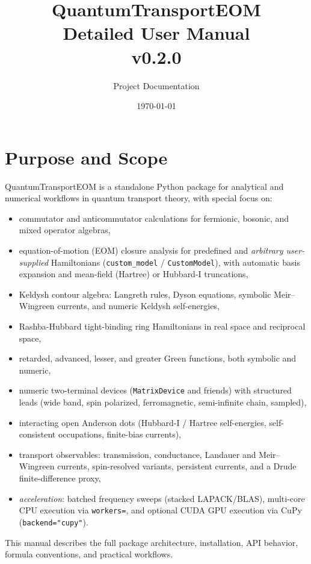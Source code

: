 \documentclass[11pt,a4paper]{article}
\title{QuantumTransportEOM\\Detailed User Manual\\\large v0.2.0}
\author{Project Documentation}
\date{\today}
\begin{document}
\maketitle
\tableofcontents
\newpage

\section{Purpose and Scope}
QuantumTransportEOM is a standalone Python package for analytical and numerical workflows in quantum transport theory, with special focus on:
\begin{itemize}[leftmargin=1.5em]
  \item commutator and anticommutator calculations for fermionic, bosonic, and mixed operator algebras,
  \item equation-of-motion (EOM) closure analysis for predefined and \emph{arbitrary user-supplied} Hamiltonians (\texttt{custom\_model} / \texttt{CustomModel}), with automatic basis expansion and mean-field (Hartree) or Hubbard-I truncations,
  \item Keldysh contour algebra: Langreth rules, Dyson equations, symbolic Meir--Wingreen currents, and numeric Keldysh self-energies,
  \item Rashba-Hubbard tight-binding ring Hamiltonians in real space and reciprocal space,
  \item retarded, advanced, lesser, and greater Green functions, both symbolic and numeric,
  \item numeric two-terminal devices (\texttt{MatrixDevice} and friends) with structured leads (wide band, spin polarized, ferromagnetic, semi-infinite chain, sampled),
  \item interacting open Anderson dots (Hubbard-I / Hartree self-energies, self-consistent occupations, finite-bias currents),
  \item transport observables: transmission, conductance, Landauer and Meir--Wingreen currents, spin-resolved variants, persistent currents, and a Drude finite-difference proxy,
  \item \emph{acceleration}: batched frequency sweeps (stacked LAPACK/BLAS), multi-core CPU execution via \texttt{workers=}, and optional CUDA GPU execution via CuPy (\texttt{backend="cupy"}).
\end{itemize}

This manual describes the full package architecture, installation, API behavior, formula conventions, and practical workflows.
\end{document}
